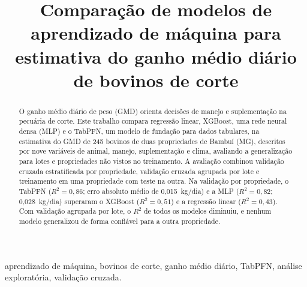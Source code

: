 \documentclass[conference]{IEEEtran}
\begin{document}
\title{Comparação de modelos de aprendizado de máquina para estimativa do ganho médio diário de bovinos de corte}

\author{
\and
{}
\and
{}
}

\maketitle

\begin{abstract}
O ganho médio diário de peso (GMD) orienta decisões de manejo e suplementação na pecuária de corte. Este trabalho compara regressão linear, XGBoost, uma rede neural densa (MLP) e o TabPFN, um modelo de fundação para dados tabulares, na estimativa do GMD de 245 bovinos de duas propriedades de Bambuí (MG), descritos por nove variáveis de animal, manejo, suplementação e clima, avaliando a generalização para lotes e propriedades não vistos no treinamento. A avaliação combinou validação cruzada estratificada por propriedade, validação cruzada agrupada por lote e treinamento em uma propriedade com teste na outra. Na validação por propriedade, o TabPFN ($R^2 = 0{,}86$; erro absoluto médio de 0,015~kg/dia) e a MLP ($R^2 = 0{,}82$; 0,028~kg/dia) superaram o XGBoost ($R^2 = 0{,}51$) e a regressão linear ($R^2 = 0{,}43$). Com validação agrupada por lote, o $R^2$ de todos os modelos diminuiu, e nenhum modelo generalizou de forma confiável para a outra propriedade.
\end{abstract}

\begin{IEEEkeywords}
aprendizado de máquina, bovinos de corte, ganho médio diário, TabPFN, análise exploratória, validação cruzada.
\end{IEEEkeywords}
\end{document}
